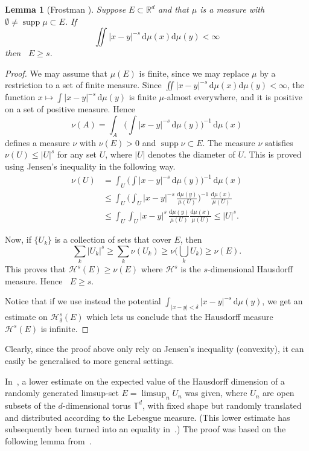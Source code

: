 \documentclass[11pt]{article}
\newtheorem{lemm}[theo]{Lemma}
\theoremstyle{definition}
\numberwithin{equation}{section}
\numberwithin{figure}{section}
\numberwithin{table}{section}
\DeclareMathOperator{\dimh}{dim_H}
\DeclareMathOperator{\supp}{supp}
\newcommand*{\dd}{\mathrm{d}}
\begin{document}
\begin{lemm}[Frostman {\cite[Th\'eor\`eme~47.2]{frostman}}]\label{lem:classical}
Suppose $E \subset \mathbb{R}^d$ and that $\mu$ is a measure with $\emptyset \neq \supp \mu \subset E$. If
\[
\iint |x-y|^{-s} \, \dd\mu (x) \dd \mu (y) < \infty
\]
then $\dimh E \geq s$.
\end{lemm}

\begin{proof}
We may assume that $\mu (E)$ is finite, since we may replace $\mu$ by a restriction to a set of finite measure. Since $\iint |x-y|^{-s}
\, \dd\mu (x) \dd \mu (y) < \infty$, the function $x
\mapsto \int |x-y|^{-s} \, \dd \mu (y)$ is finite $\mu$-almost everywhere, and it is positive on a set of positive measure. Hence
\[
\nu (A) = \int_A \biggl(\int |x-y|^{-s} \, \dd \mu (y)
\biggr)^{-1} \, \dd \mu (x)
\]
defines a measure $\nu$ with $\nu (E) > 0$ and $\supp \nu \subset E$. The measure $\nu$ satisfies $\nu(U) \leq |U|^s$ for any set $U$, where $|U|$ denotes the diameter of $U$. This is proved using Jensen's inequality in the following way.
\begin{align*}
\nu (U) &= \int_U \biggl(\int |x-y|^{-s} \, \dd \mu (y)
\biggr)^{-1} \, \dd \mu (x) \\ &\leq \int_U \biggl(\int_U |x-y|^{-s} \, \frac{\dd \mu (y)}{\mu (U)} \biggr)^{-1} \,
\frac{\dd \mu (x)}{\mu (U)} \\ &\leq \int_U \int_U |x-y|^{s} \, \frac{\dd \mu (y)}{\mu (U)} \frac{\dd
\mu (x)}{\mu (U)} \leq |U|^s.
\end{align*}

Now, if $\{U_k\}$ is a collection of sets that cover $E$, then
\[
\sum_k |U_k|^s \geq \sum_k \nu (U_k) \geq \nu \biggl(\bigcup_k U_k
\biggr) \geq \nu (E).
\]
This proves that $\mathscr{H}^s (E) \geq \nu (E)$ where $\mathscr{H}^s$ is the $s$-dimensional Hausdorff measure. Hence $\dimh E \geq s$.

Notice that if we use instead the potential $\int_{|x-y|<\delta} |x-y|^{-s} \, \dd \mu (y)$, we get an estimate on $\mathscr{H}_\delta^s (E)$ which lets us conclude that the Hausdorff measure $\mathscr{H}^s (E)$ is infinite.
\end{proof}

Clearly, since the proof above only rely on Jensen's inequality (convexity), it can easily be generalised to more general settings.

In~\cite{persson}, a lower estimate on the expected value of the Hausdorff dimension of a randomly generated limsup-set $E = \limsup_n U_n$ was given, where $U_n$ are open subsets of the $d$-dimensional torus $\mathbb{T}^d$, with fixed shape but randomly translated and distributed according to the Lebesgue measure. (This lower estimate has subsequently been turned into an equality in~\cite{fengetal}.) The proof was based on the following lemma from~\cite{perssonreeve}.
\end{document}
